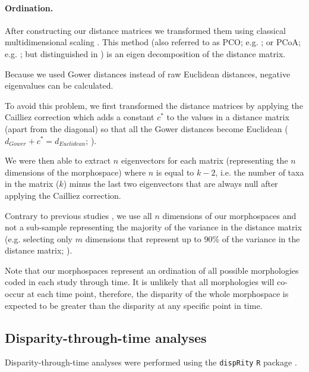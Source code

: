 \documentclass[12pt,a4paper]{article}
\begin{document}
\paragraph{Ordination.}
After constructing our distance matrices we transformed them using classical multidimensional scaling \citep[MDS;][]{torgerson1965multidimensional,GOWER01121966,cailliez1983analytical}.
This method (also referred to as PCO; e.g. \citealt{Brusatte2015}; or PCoA; e.g. \citealt{paradisape:2004}; but distinguished in \citealt{legendre2012numerical}) is an eigen decomposition of the distance matrix.

Because we used Gower distances instead of raw Euclidean distances, negative eigenvalues can be calculated.

To avoid this problem, we first transformed the distance matrices by applying the Cailliez correction \citep{cailliez1983analytical} which adds a constant $c^*$ to the values in a distance matrix (apart from the diagonal) so that all the Gower distances become Euclidean ($d_{Gower}+c^*=d_{Euclidean}$; \citealt{cailliez1983analytical}). 

We were then able to extract $n$ eigenvectors for each matrix (representing the $n$ dimensions of the morphospace) where $n$ is equal to $k-2$, i.e. the number of taxa in the matrix ($k$) minus the last two eigenvectors that are always null after applying the Cailliez correction.

Contrary to previous studies \citep[e.g][]{brusatte50,cisneros2010,prentice2011,anderson2012using,Hughes20082013,bentonmodels2014}, we use all $n$ dimensions of our morphospaces and not a sub-sample representing the majority of the variance in the distance matrix (e.g. selecting only $m$ dimensions that represent up to 90\% of the variance in the distance matrix; \citealt{Brusatte12092008,toljagictriassic-jurassic2013}).

Note that our morphospaces represent an ordination of all possible morphologies coded in each study through time.
It is unlikely that all morphologies will co-occur at each time point, therefore, the disparity of the whole morphospace is expected to be greater than the disparity at any specific point in time.

\subsection{Disparity-through-time analyses}

Disparity-through-time analyses were performed using the \texttt{dispRity} \texttt{R} package \citep{dispRity.v02}. 
\end{document}
